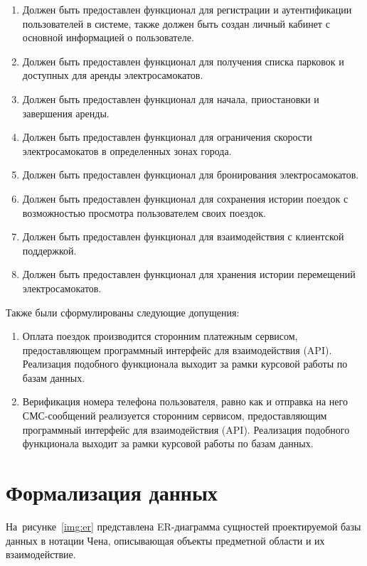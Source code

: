 \begin{enumerate}
    \item Должен быть предоставлен функционал для регистрации и аутентификации пользователей в системе, также должен быть создан личный кабинет с основной информацией о пользователе.
    \item Должен быть предоставлен функционал для получения списка парковок и доступных для аренды электросамокатов.
    \item Должен быть предоставлен функционал для начала, приостановки и завершения аренды.
    \item Должен быть предоставлен функционал для ограничения скорости электросамокатов в определенных зонах города.
    \item Должен быть предоставлен функционал для бронирования электросамокатов.
    \item Должен быть предоставлен функционал для сохранения истории поездок с возможностью просмотра пользователем своих поездок.
    \item Должен быть предоставлен функционал для взаимодействия с клиентской поддержкой.
    \item Должен быть предоставлен функционал для хранения истории перемещений электросамокатов.
\end{enumerate}

Также были сформулированы следующие допущения:

\begin{enumerate}
    \item Оплата поездок производится сторонним платежным сервисом, предоставляющем программный интерфейс для взаимодействия (API). Реализация подобного функционала выходит за рамки курсовой работы по базам данных.
    \item Верификация номера телефона пользователя, равно как и отправка на него СМС-сообщений реализуется сторонним сервисом, предоставляющим программный интерфейс для взаимодействия (API). Реализация подобного функционала выходит за рамки курсовой работы по базам данных.
\end{enumerate}

\section{Формализация данных}

На~рисунке~\ref{img:er} представлена ER-диаграмма сущностей проектируемой базы данных в нотации Чена, описывающая объекты предметной области и их взаимодействие.

